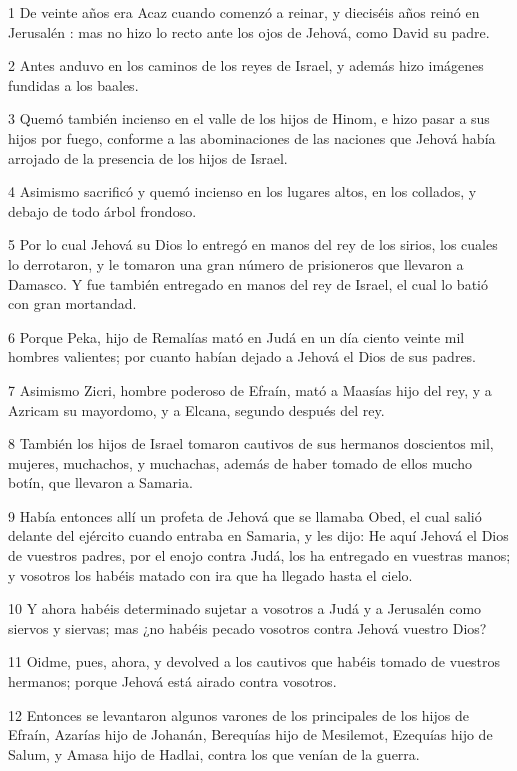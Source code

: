 \par 1 De veinte años era Acaz cuando comenzó a reinar, y dieciséis años reinó en Jerusalén : mas no hizo lo recto ante los ojos de Jehová, como David su padre.
\par 2 Antes anduvo en los caminos de los reyes de Israel, y además hizo imágenes fundidas a los baales.
\par 3 Quemó también incienso en el valle de los hijos de Hinom, e hizo pasar a sus hijos por fuego, conforme a las abominaciones de las naciones que Jehová había arrojado de la presencia de los hijos de Israel.
\par 4 Asimismo sacrificó y quemó incienso en los lugares altos, en los collados, y debajo de todo árbol frondoso.
\par 5 Por lo cual Jehová su Dios lo entregó en manos del rey de los sirios, los cuales lo derrotaron, y le tomaron una gran número de prisioneros que llevaron a Damasco. Y fue también entregado en manos del rey de Israel, el cual lo batió con gran mortandad.
\par 6 Porque Peka, hijo de Remalías mató en Judá en un día ciento veinte mil hombres valientes; por cuanto habían dejado a Jehová el Dios de sus padres. 
\par 7 Asimismo Zicri, hombre poderoso de Efraín, mató a Maasías hijo del rey, y a Azricam su mayordomo, y a Elcana, segundo después del rey.
\par 8 También los hijos de Israel tomaron cautivos de sus hermanos doscientos mil, mujeres, muchachos, y muchachas, además de haber tomado de ellos mucho botín, que llevaron a Samaria.
\par 9 Había entonces allí un profeta de Jehová que se llamaba Obed, el cual salió delante del ejército cuando entraba en Samaria, y les dijo: He aquí Jehová el Dios de vuestros padres, por el enojo contra Judá, los ha entregado en vuestras manos; y vosotros los habéis matado con ira que ha llegado hasta el cielo.
\par 10 Y ahora habéis determinado sujetar a vosotros a Judá y a Jerusalén  como siervos y siervas; mas ¿no habéis pecado vosotros contra Jehová vuestro Dios?
\par 11 Oidme, pues, ahora, y devolved a los cautivos que habéis tomado de vuestros hermanos; porque Jehová está airado contra vosotros.
\par 12 Entonces se levantaron algunos varones de los principales de los hijos de Efraín, Azarías hijo de Johanán,  Berequías hijo de Mesilemot, Ezequías hijo de Salum, y Amasa hijo de Hadlai, contra los que venían de la guerra.
